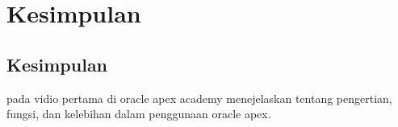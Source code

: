 \chapter{Kesimpulan}
\section{Kesimpulan}
pada vidio pertama di oracle apex academy menejelaskan tentang pengertian, fungsi, dan kelebihan dalam penggunaan oracle apex.